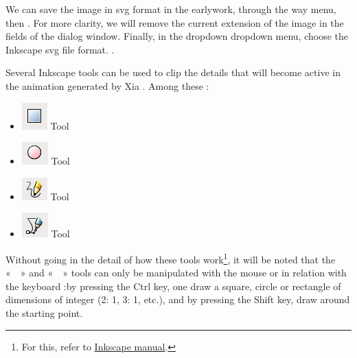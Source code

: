 We can save the image in svg format in the earlywork, 
through the way  menu, then . 
For more clarity, we will remove the current extension of the image 
in the fields  of the dialog window. Finally, in the 
dropdown dropdown menu, choose the Inkscape svg file format. .

Several Inkscape tools can be used to clip the details that
will become active in the animation generated by Xia . Among these :
\begin{itemize}
 \item \includegraphics[scale=0.5]{./images/rec_carre} Tool 
 \item \includegraphics[scale=0.5]{./images/cercles} Tool 
 \item \includegraphics[scale=0.5]{./images/lignes} Tool 
 \item \includegraphics[scale=0.5]{./images/bezier} Tool 
\end{itemize}

Without going in the detail of how these tools work\footnote{For this, 
refer to \href{http://inkscape.org/doc/shapes/tutorial-shapes.fr.html}{Inkscape manual}.}, 
it will be noted that the «~~» and «~~»  tools can only be manipulated with the mouse or 
in relation with the keyboard :by pressing the Ctrl key, one draw a square, 
circle or rectangle of dimensions of integer (2: 1, 3: 1, etc.), and 
by pressing the Shift key, draw around the starting point.

